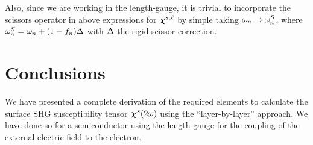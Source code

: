 \documentclass[floatfix,prb,aps,superscriptaddress,11pt,preprint]{revtex4}
\begin{document}
Also, since we are working in the length-gauge, it is trivial to
incorporate the scissors operator in above expressions for $\boldsymbol{\chi}^{s,\ell}$
by simple taking
$\omega_n\to\omega_n^S$, where $\omega_n^S=\omega_n+(1-f_n)\Delta$ with $\Delta$ the
rigid scissor correction.\cite{nastosPRB05,cabellosPRB09}


\section{Conclusions}\label{con}

We have presented a complete derivation of the required elements to
calculate the surface SHG susceptibility tensor $\boldsymbol{\chi}^s(2\omega)$ 
using the ``layer-by-layer'' approach. We have done so for a
semiconductor using the 
length gauge for the coupling of the external electric field to the electron. 


\appendix
\end{document}
